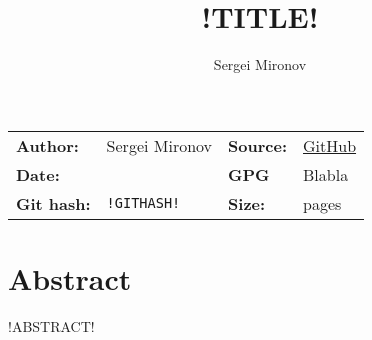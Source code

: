 \documentclass{article}
\title{!TITLE!}
\author{Sergei Mironov}
\begin{document}
\begin{center}
\begin{tabular}{L{2cm} R{4cm} | L{2cm} R{4cm}}
\textbf{Author:} & Sergei Mironov & \textbf{Source:} & \href{!SOURCELINK!}{GitHub} \\
\textbf{Date:} & \localdate{\today} & \textbf{GPG} & Blabla \\
\textbf{Git hash:} & \texttt{!GITHASH!} & \textbf{Size:} & \pageref{LastPage} pages \\
\end{tabular}
\end{center}

\vsp

\makeatletter
\begin{center}
  \LARGE \bfseries \@title
\end{center}
\makeatother

\section*{Abstract}

!ABSTRACT!

\tableofcontents



\printbibliography
\end{document}
